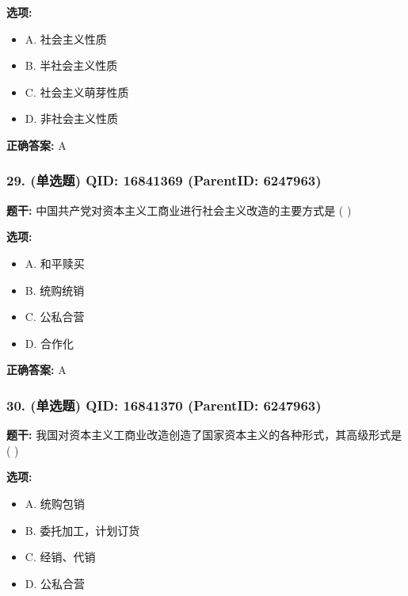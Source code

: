 \documentclass[12pt,UTF8]{ctexart}
\begin{document}
\textbf{选项:}
\begin{itemize}[leftmargin=*]

  \item A. 社会主义性质

  \item B. 半社会主义性质

  \item C. 社会主义萌芽性质

  \item D. 非社会主义性质

\end{itemize}

\textbf{正确答案:}
A

\vspace{0.3em}\hrulefill\vspace{0.7em}

\subsubsection*{29. (单选题) \small QID: 16841369 (ParentID: 6247963)}

\textbf{题干:}
中国共产党对资本主义工商业进行社会主义改造的主要方式是 ( )



\textbf{选项:}
\begin{itemize}[leftmargin=*]

  \item A. 和平赎买

  \item B. 统购统销

  \item C. 公私合营

  \item D. 合作化

\end{itemize}

\textbf{正确答案:}
A

\vspace{0.3em}\hrulefill\vspace{0.7em}

\subsubsection*{30. (单选题) \small QID: 16841370 (ParentID: 6247963)}

\textbf{题干:}
我国对资本主义工商业改造创造了国家资本主义的各种形式，其高级形式是 ( )



\textbf{选项:}
\begin{itemize}[leftmargin=*]

  \item A. 统购包销

  \item B. 委托加工，计划订货

  \item C. 经销、代销

  \item D. 公私合营

\end{itemize}
\end{document}
